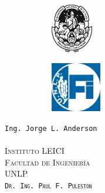 \begin{titlepage}
\begin{center}
            \\
            \vfill
            \begin{figure}[H]
                \centering
                \hspace{2.5em}
                \begin{subfigure}
                    \centering
                    \includegraphics[width=0.2\textwidth]{Imagenes/UNLP.pdf}
                \end{subfigure}
                \hspace{4em}
                \begin{subfigure}
                    \centering
                    \includegraphics[width=0.24\textwidth]{Imagenes/FI Invertido.png}
                \end{subfigure}
            \end{figure}
            \vspace{0.5cm}
            \begin{multicols}{3}
                \large
                \texttt{Ing. Jorge L. Anderson}
                \\
                \vspace{0.1cm}
                \LARGE\scshape
                \\
                \normalfont
            \columnbreak
                \Bold\large\scshape
                Instituto LEICI
                \\
                \vspace{0.1cm}
                Facultad de Ingeniería
                \\
                \vspace{0.1cm}
                UNLP
                \\
            \columnbreak
                \vspace{0.1cm}
                \normalfont\large
                \texttt{Dr. Ing. Paul F. Puleston}
                \\
                \vspace{0.1cm}
                \LARGE\scshape
                \normalfont
            \end{multicols}
        \end{center}
    \end{titlepage}